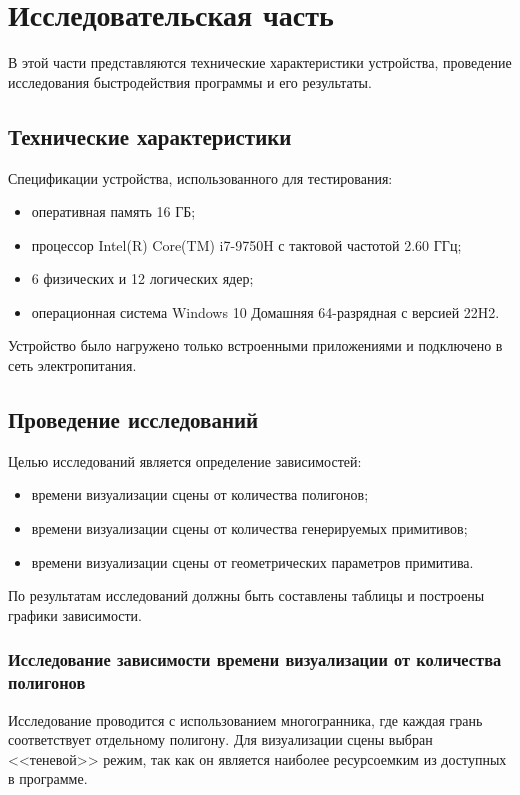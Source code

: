 \chapter{Исследовательская часть}

В этой части представляются технические характеристики устройства,
проведение исследования быстродействия программы и его результаты.

\section{Технические характеристики}

Спецификации устройства, использованного для тестирования:
\begin{itemize}[label=--]
	\item оперативная память 16 ГБ;
	\item процессор Intel(R) Core(TM) i7-9750H с тактовой частотой 2.60 ГГц;
	\item 6 физических и 12 логических ядер;
	\item операционная система Windows 10 Домашняя 64-разрядная с версией 22H2.
\end{itemize}

Устройство было нагружено только встроенными приложениями и подключено в сеть электропитания. 

\section{Проведение исследований}

Целью исследований является определение зависимостей: 
\begin{itemize}[label=--]
	\item времени визуализации сцены от количества полигонов;
	\item времени визуализации сцены от количества генерируемых примитивов;
	\item времени визуализации сцены от геометрических параметров примитива.
\end{itemize}

По результатам исследований должны быть составлены таблицы и построены графики зависимости.

\subsection{Исследование зависимости времени визуализации от количества полигонов}

Исследование проводится с использованием многогранника, где каждая грань соответствует отдельному полигону. Для визуализации сцены выбран <<теневой>> режим, так как он является наиболее ресурсоемким из доступных в программе.

